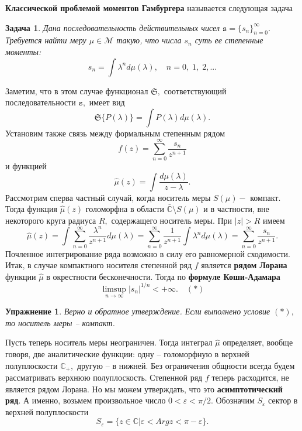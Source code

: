 \documentclass[12pt,a4paper]{article}
\theoremstyle{plain}   \newtheorem{Pro}{Задача}
\newtheorem{Exe}{Упражнение}
\begin{document}
{\bfseries Классической проблемой моментов Гамбургера}
называется следующая задача
\begin{Pro}
Дана последовательность действительных чисел
$ \mathtt{s}=\{ s_n \} _{n=0}^{\infty} . $
Требуется найти меру
$ \mu \in \mathcal{M} $
такую, что числа
$ s_n $
суть ее степенные моменты:
$$
  s_n =\int \lambda ^n d \mu ( \lambda ) ,
  \quad n=0, \; 1, \; 2,...
$$
\end{Pro}
Заметим, что в этом случае функционал
$ \mathfrak{S} , $
соответствующий последовательности
$ \mathtt{s} , $
имеет вид
$$
  \mathfrak{S} \{ P(\lambda ) \} =
  \int P(\lambda ) d \mu ( \lambda ).
$$
Установим также связь между формальным степенным рядом
$$
  f(z)= \sum _{n=0}^{\infty}
  \frac{s_n}{z^{n+1}}
$$
и функцией
$$
  \hat \mu (z) = \int \frac{d \mu (\lambda )}{z-\lambda }.
$$
Рассмотрим сперва частный случай, когда носитель меры
$ S( \mu ) - $
компакт. Тогда функция
$ \hat \mu (z) $
голоморфна в области
$ \bar{\mathbb{C}} \setminus S( \mu ) $
и в частности, вне некоторого круга радиуса
$ R , $
содержащего носитель меры. При
$ |z|>R $
имеем
$$
  \hat \mu (z)=\int \sum _{n=0}^{\infty}
  \frac{\lambda ^n}{z^{n+1}}d \mu (\lambda ) =
  \sum _{n=0}^{\infty} \frac{1}{z^{n+1}}
  \int \lambda ^n d \mu ( \lambda )=
  \sum _{n=0}^{\infty} \frac{s_n}{z^{n+1}}.
$$
Почленное интегрирование ряда возможно в силу его равномерной
сходимости. Итак, в случае компактного носителя степенной ряд
$ f $
является
{\bfseries рядом Лорана}
функции
$ \hat \mu $
в окрестности бесконечности. Тогда по
{\bfseries формуле Коши-Адамара}
$$
  \limsup _{n \rightarrow \infty}
  |s_n |^{1/n} < + \infty . \quad ( \ast )
$$
\begin{Exe}
Верно и обратное утверждение. Если выполнено условие
$ ( \ast ) , $
то носитель меры -- компакт.
\end{Exe}
Пусть теперь носитель меры неограничен. Тогда интеграл
$ \hat \mu $
определяет, вообще говоря, две аналитические функции: одну --
голоморфную в верхней полуплоскости
$ \mathbb{C}_+ , $
другую -- в нижней. Без ограничения общности всегда
будем рассматривать верхнюю полуплоскость. Степенной ряд
$ f $
теперь расходится, не является рядом Лорана. Но мы можем
утверждать, что это
{\bfseries асимптотический ряд}.
А именно, возьмем произвольное число
$ 0< \varepsilon < \pi /2 . $
Обозначим
$ S_{\varepsilon} $
сектор в верхней полуплоскости
$$
  S_{\varepsilon}=
  \{z \in \mathbb{C} | \varepsilon < Arg z < \pi -
  \varepsilon \} .
$$
\end{document}
